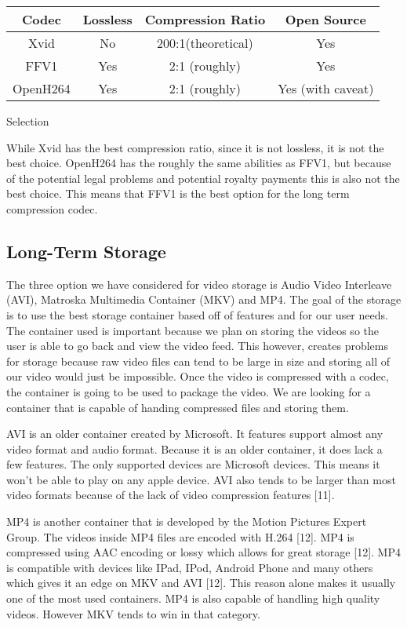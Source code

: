\documentclass[letterpaper,10pt,onecolumn,draftclsnofoot]{IEEEtran}
\begin{document}
\begin{center}
	\begin{tabular}{|c|c|c|c|}
		\hline
		\textbf{Codec} & \textbf{Lossless} & \textbf{Compression Ratio} & \textbf{Open Source} \\
		\hline
		Xvid & No & 200:1(theoretical) & Yes \\
		\hline
		FFV1 & Yes & 2:1 (roughly) & Yes \\
		\hline
		OpenH264 & Yes & 2:1 (roughly) & Yes (with caveat) \\
		\hline
		
	\end{tabular}
\end{center}

Selection

While Xvid has the best compression ratio, since it is not lossless, it is not the best choice.
OpenH264 has the roughly the same abilities as FFV1, but because of the potential legal problems and potential royalty payments this is also not the best choice.
This means that FFV1 is the best option for the long term compression codec.

\newpage
\subsection{Long-Term Storage} %

The three option we have considered for video storage is Audio Video Interleave (AVI), Matroska Multimedia Container (MKV) and MP4.
The goal of the storage is to use the best storage container based off of features and for our user needs.
The container used is important because we plan on storing the videos so the user is able to go back and view the video feed.
This however, creates problems for storage because raw video files can tend to be large in size and storing all of our video would just be impossible.
Once the video is compressed with a codec, the container is going to be used to package the video.
We are looking for a container that is capable of handing compressed files and storing them.

AVI is an older container created by Microsoft. It features support almost any video format and audio format.
Because it is an older container, it does lack a few features.
The only supported devices are Microsoft devices.
This means it won't be able to play on any apple device.
AVI also tends to be larger than most video formats because of the lack of video compression features [11].

MP4 is another container that is developed by the Motion Pictures Expert Group.
The videos inside MP4 files are encoded with H.264 [12].
MP4 is compressed using AAC encoding or lossy which allows for great storage [12].
MP4 is compatible with devices like IPad, IPod, Android Phone and many others which gives it an edge on MKV and AVI [12].
This reason alone makes it usually one of the most used containers.
MP4 is also capable of handling high quality videos.
However MKV tends to win in that category.
\end{document}

